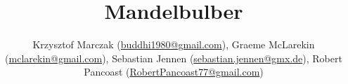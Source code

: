 % 
%




\newcommand{\mTitle}{Mandelbulber}
\newcommand{\mSubtitle}{Tutorial \& User Manual}
\newcommand{\mVersionDocument}{0.9.1}
\newcommand{\mDateDocument}{22nd, September 2016}
\newcommand{\mVersionMandelbulber}{2.0.9}
\newcommand{\mAuthor}{
	Krzysztof Marczak (\href{mailto:buddhi1980@gmail.com}{buddhi1980@gmail.com}),
	Graeme McLarekin (\href{mailto:mclarekin@gmail.com}{mclarekin@gmail.com}),
	Sebastian Jennen (\href{mailto:sebastian.jennen@gmx.de}{sebastian.jennen@gmx.de}),
	Robert Pancoast (\href{mailto:RobertPancoast77@gmail.com}{RobertPancoast77@gmail.com})}


\title{\mTitle}
\author{\mAuthor}




